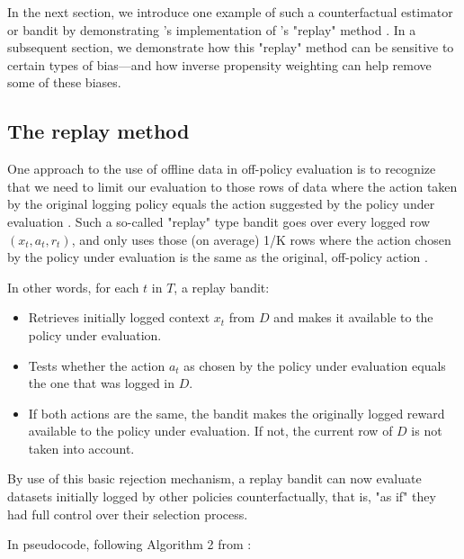\documentclass{jss}
\begin{document}
In the next section, we introduce one example of such a counterfactual estimator or bandit by demonstrating 's implementation of \cite{Li2011}'s "replay" method \citep{Nicol2014}. In a subsequent section, we demonstrate how this "replay" method can be sensitive to certain types of bias---and how inverse propensity weighting can help remove some of these biases.

\subsection{The replay method} \label{offli}

One approach to the use of offline data in off-policy evaluation is to recognize that we need to limit our evaluation to those rows of data where the action taken by the original logging policy equals the action suggested by the policy under evaluation \citep{Li2012,Li2011}. Such a so-called "replay" type bandit goes over every logged row \((x_{t},a_{t},r_{t})\), and only uses those (on average) 1/K rows where the action chosen by the policy under evaluation is the same as the original, off-policy action \citep{Nicol2014}.

In other words, for each $t$ in $T$, a replay bandit:

\begin{itemize}
   \item{Retrieves initially logged context $x_{t}$ from $D$ and makes it available to the policy under evaluation.}
   \item{Tests whether the action $a_{t}$ as chosen by the policy under evaluation equals the one that was logged in $D$.}
      \item{If both actions are the same, the bandit makes the originally logged reward available to the policy under evaluation. If not, the current row of $D$ is not taken into account. }
\end{itemize}

By use of this basic rejection mechanism, a replay bandit can now evaluate datasets initially logged by other policies counterfactually, that is, "as if" they had full control over their selection process.

In pseudocode, following Algorithm 2 from \cite{Li2011}:
\end{document}
